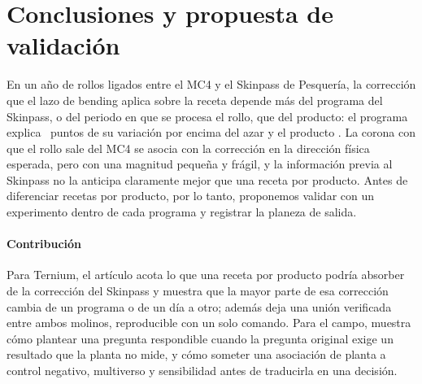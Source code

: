 \section{Conclusiones y propuesta de validación}
\label{sec:conclusiones}

En un año de rollos ligados entre el MC4 y el Skinpass de Pesquería, la corrección que el lazo de bending aplica sobre
la receta depende más del programa del Skinpass, o del periodo en que se procesa el rollo, que del producto: el
programa explica \ExcesoPrograma~puntos de su variación por encima del azar y el producto \ExcesoProducto. La corona con
que el rollo sale del MC4 se asocia con la corrección en la dirección física esperada, pero con una magnitud pequeña y
frágil, y la información previa al Skinpass no la anticipa claramente mejor que una receta por producto. Antes de
diferenciar recetas por producto, por lo tanto, proponemos validar con un experimento dentro de cada programa y
registrar la planeza de salida.

\paragraph{Contribución} Para Ternium, el artículo acota lo que una receta por producto podría absorber de la
corrección del Skinpass y muestra que la mayor parte de esa corrección cambia de un programa o de un día a otro; además
deja una unión verificada entre ambos molinos, reproducible con un solo comando. Para el campo, muestra cómo plantear
una pregunta respondible cuando la pregunta original exige un resultado que la planta no mide, y cómo someter una
asociación de planta a control negativo, multiverso y sensibilidad antes de traducirla en una decisión.

